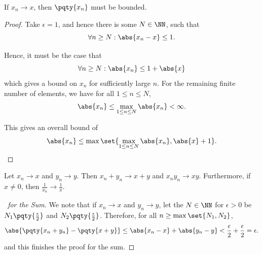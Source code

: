 \begin{lemma}
    \label{lem:seq-convergence-bounded}%
    If \(x_n \to x\), then \(\pqty{x_n}\) must be bounded.
\end{lemma}

\begin{proof}
    Take \(\epsilon = 1\), and hence there is some \(N \in \NN\), such that
    \[
        \forall n \geq N: \abs{x_n - x} \leq 1.
    \]

    Hence, it must be the case that
    \[
        \forall n \geq N: \abs{x_n} \leq 1 + \abs{x}
    \]
    which gives a bound on \(x_n\) for sufficiently large \(n\). For the remaining finite number of elements, we have for all \(1 \leq n \leq N\),
    \[
        \abs{x_n} \leq \max_{1 \leq n \leq N} \abs{x_n} < \infty.
    \]

    This gives an overall bound of
    \[
        \abs{x_n} \leq \max\set{\max_{1 \leq n \leq N} \abs{x_n}, \abs{x} + 1}.
    \]
\end{proof}

\begin{lemma}
    \label{lem:seq-limits-arithmetic}%
    Let \(x_n \to x\) and \(y_n \to y\). Then \(x_n + y_n \to x + y\) and \(x_n y_n \to xy\). Furthermore, if \(x \neq 0\), then \(\frac{1}{x_n} \to \frac{1}{x}\).
\end{lemma}

\begin{proof}[\proofname\ for the Sum]
    We note that if \(x_n \to x\) and \(y_n \to y\), let the \(N \in \NN\) for \(\epsilon > 0\) be \(N_1\pqty{\frac{\epsilon}{2}}\) and \(N_2\pqty{\frac{\epsilon}{2}}\). Therefore, for all \(n \geq \max\set{N_1, N_2}\),
    \[
        \abs{\pqty{x_n + y_n} - \pqty{x + y}}
        \leq \abs{x_n - x} + \abs{y_n - y} < \frac{\epsilon}{2} + \frac{\epsilon}{2} = \epsilon.
    \]
    and this finishes the proof for the sum.
\end{proof}

